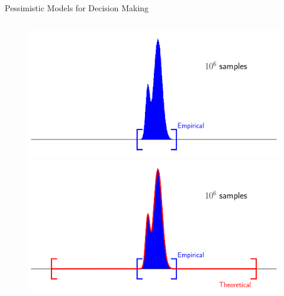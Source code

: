 \documentclass[lecture]{beamer}
\begin{document}
\begin{frame}{\normalsize Pessimistic Models for Decision Making}
\begin{columns}[t]
  \begin{overlayarea}{\textwidth}{0.4\textheight}
    \begin{figure}
     \newcommand{\FS}{1}
        {
        \center
	\includegraphics[width=1\textwidth,clip]{Codes/BasicsSafety/Support0.pdf}
	}
	      \only<14>
        {
        \center
	\includegraphics[width=1\textwidth,clip]{Codes/BasicsSafety/Support1.pdf}
	}
	\end{figure}
  \end{overlayarea} 

\end{columns}

  




\end{frame}


\end{document}
